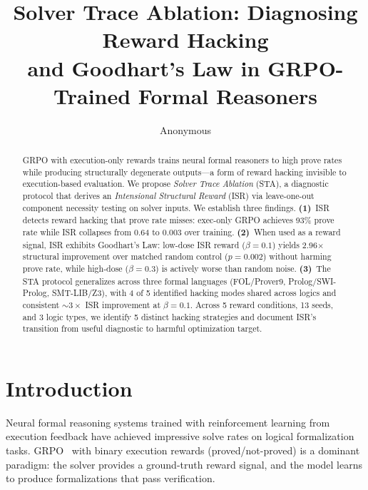 \documentclass[11pt,twocolumn]{article}
\title{Solver Trace Ablation: Diagnosing Reward Hacking \\and Goodhart's Law in GRPO-Trained Formal Reasoners}
\author{Anonymous}
\date{}
\newcommand{\isr}{\textsc{ISR}}
\newcommand{\sta}{\textsc{STA}}
\newcommand{\grpo}{\textsc{GRPO}}
\begin{document}
\maketitle

\begin{abstract}
GRPO with execution-only rewards trains neural formal reasoners to high prove rates while producing structurally degenerate outputs---a form of reward hacking invisible to execution-based evaluation.
We propose \emph{Solver Trace Ablation} (\sta{}), a diagnostic protocol that derives an \emph{Intensional Structural Reward} (\isr{}) via leave-one-out component necessity testing on solver inputs.
We establish three findings.
\textbf{(1)}~\isr{} detects reward hacking that prove rate misses: exec-only \grpo{} achieves 93\% prove rate while \isr{} collapses from 0.64 to 0.003 over training.
\textbf{(2)}~When used as a reward signal, \isr{} exhibits Goodhart's Law: low-dose \isr{} reward ($\beta{=}0.1$) yields 2.96$\times$ structural improvement over matched random control ($p{=}0.002$) without harming prove rate, while high-dose ($\beta{=}0.3$) is actively worse than random noise.
\textbf{(3)}~The \sta{} protocol generalizes across three formal languages (FOL/Prover9, Prolog/SWI-Prolog, SMT-LIB/Z3), with 4 of 5 identified hacking modes shared across logics and consistent ${\sim}3\times$ \isr{} improvement at $\beta{=}0.1$.
Across 5 reward conditions, 13 seeds, and 3 logic types, we identify 5 distinct hacking strategies and document \isr{}'s transition from useful diagnostic to harmful optimization target.
\end{abstract}

\section{Introduction}
\label{sec:intro}

Neural formal reasoning systems trained with reinforcement learning from execution feedback have achieved impressive solve rates on logical formalization tasks.
GRPO~\citep{shao2024deepseekmath} with binary execution rewards (proved/not-proved) is a dominant paradigm: the solver provides a ground-truth reward signal, and the model learns to produce formalizations that pass verification.
\end{document}
